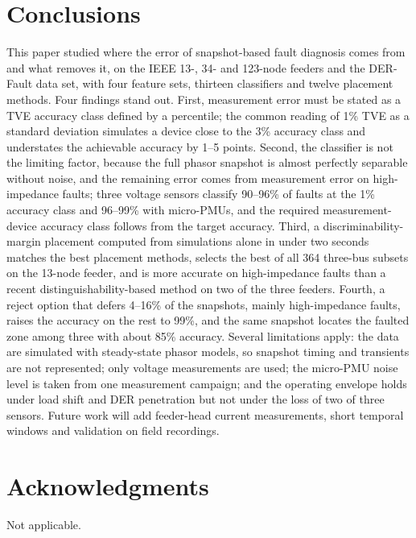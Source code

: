 \documentclass[11pt]{article}
\newenvironment{nw}{}{}
\begin{document}
\section{Conclusions}\label{sec6}

\begin{nw}
This paper studied where the error of snapshot-based fault diagnosis comes from and what removes it, on the IEEE 13-, 34- and 123-node feeders and the DER-Fault data set, with four feature sets, thirteen classifiers and twelve placement methods. Four findings stand out. First, measurement error must be stated as a TVE accuracy class defined by a percentile; the common reading of 1\% TVE as a standard deviation simulates a device close to the 3\% accuracy class and understates the achievable accuracy by 1--5 points. Second, the classifier is not the limiting factor, because the full phasor snapshot is almost perfectly separable without noise, and the remaining error comes from measurement error on high-impedance faults; three voltage sensors classify 90--96\% of faults at the 1\% accuracy class and 96--99\% with micro-PMUs, and the required measurement-device accuracy class follows from the target accuracy. Third, a discriminability-margin placement computed from simulations alone in under two seconds matches the best placement methods, selects the best of all 364 three-bus subsets on the 13-node feeder, and is more accurate on high-impedance faults than a recent distinguishability-based method on two of the three feeders. Fourth, a reject option that defers 4--16\% of the snapshots, mainly high-impedance faults, raises the accuracy on the rest to 99\%, and the same snapshot locates the faulted zone among three with about 85\% accuracy. Several limitations apply: the data are simulated with steady-state phasor models, so snapshot timing and transients are not represented; only voltage measurements are used; the micro-PMU noise level is taken from one measurement campaign; and the operating envelope holds under load shift and DER penetration but not under the loss of two of three sensors. Future work will add feeder-head current measurements, short temporal windows and validation on field recordings.
\end{nw}

\section*{Acknowledgments}
Not applicable.
\end{document}
